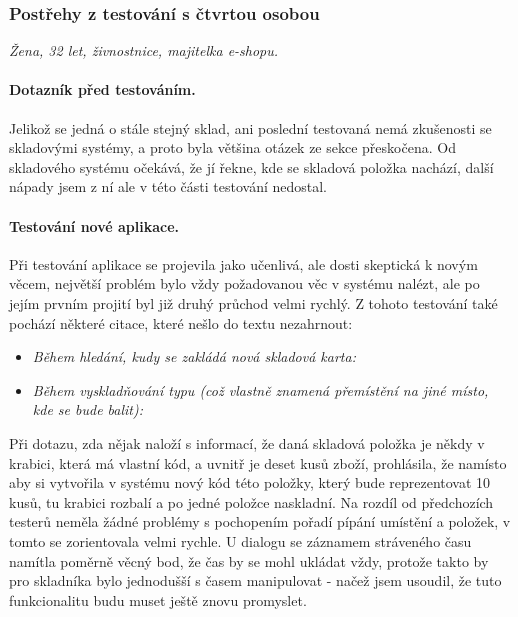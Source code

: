 
\subsubsection{Postřehy z testování s čtvrtou osobou}
\emph{Žena, 32 let, živnostnice, majitelka e-shopu.}

\paragraph{Dotazník před testováním.} Jelikož se jedná o stále stejný sklad, ani poslední testovaná nemá zkušenosti se skladovými systémy, a proto byla většina otázek ze sekce  přeskočena. Od skladového systému očekává, že jí řekne, kde se skladová položka nachází, další nápady jsem z ní ale v této části testování nedostal.

\paragraph{Testování nové aplikace.} Při testování aplikace se projevila jako učenlivá, ale dosti skeptická k novým věcem, největší problém bylo vždy požadovanou věc v systému nalézt, ale po jejím prvním projití byl již druhý průchod velmi rychlý. Z tohoto testování také pochází některé citace, které nešlo do textu nezahrnout:
\begin{itemize}
	\item \emph{Během hledání, kudy se zakládá nová skladová karta:} 
	\item \emph{Během vyskladňování typu  (což vlastně znamená přemístění na jiné místo, kde se bude balit):} 
\end{itemize}
Při dotazu, zda nějak naloží s informací, že daná skladová položka je někdy v krabici, která má vlastní kód, a uvnitř je deset kusů zboží, prohlásila, že namísto aby si vytvořila v systému nový kód této položky, který bude reprezentovat 10 kusů, tu krabici rozbalí a po jedné položce naskladní. Na rozdíl od předchozích testerů neměla žádné problémy s pochopením pořadí pípání umístění a položek, v tomto se zorientovala velmi rychle. U dialogu se záznamem stráveného času namítla poměrně věcný bod, že čas by se mohl ukládat vždy, protože takto by pro skladníka bylo jednodušší s časem manipulovat - načež jsem usoudil, že tuto funkcionalitu budu muset ještě znovu promyslet.

